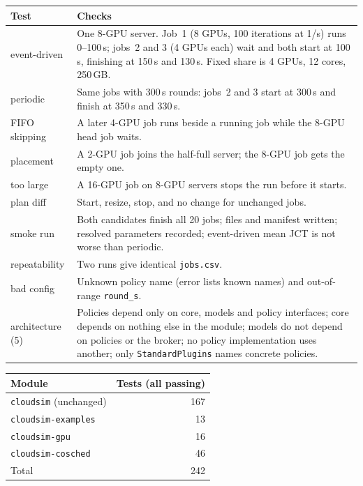\documentclass[11pt,a4paper]{article}
\newcommand{\code}[1]{\texttt{#1}}
\begin{document}
\begin{center}
\begin{tabularx}{\linewidth}{@{}lX@{}}
\toprule
Test & Checks \\
\midrule
event-driven & One 8-GPU server. Job~1 (8 GPUs, 100 iterations at 1/s) runs 0--100\,s; jobs~2 and 3
  (4 GPUs each) wait and both start at 100\,s, finishing at 150\,s and 130\,s. Fixed share is 4 GPUs,
  12 cores, 250\,GB. \\
periodic & Same jobs with 300\,s rounds: jobs~2 and 3 start at 300\,s and finish at 350\,s and 330\,s. \\
FIFO skipping & A later 4-GPU job runs beside a running job while the 8-GPU head job waits. \\
placement & A 2-GPU job joins the half-full server; the 8-GPU job gets the empty one. \\
too large & A 16-GPU job on 8-GPU servers stops the run before it starts. \\
plan diff & Start, resize, stop, and no change for unchanged jobs. \\
smoke run & Both candidates finish all 20 jobs; files and manifest written; resolved parameters
  recorded; event-driven mean JCT is not worse than periodic. \\
repeatability & Two runs give identical \code{jobs.csv}. \\
bad config & Unknown policy name (error lists known names) and out-of-range \code{round\_s}. \\
architecture (5) & Policies depend only on core, models and policy interfaces; core depends on nothing
  else in the module; models do not depend on policies or the broker; no policy implementation uses
  another; only \code{StandardPlugins} names concrete policies. \\
\bottomrule
\end{tabularx}
\end{center}

\begin{center}
\begin{tabular}{@{}lr@{}}
\toprule
Module & Tests (all passing) \\
\midrule
\code{cloudsim} (unchanged) & 167 \\
\code{cloudsim-examples} & 13 \\
\code{cloudsim-gpu} & 16 \\
\code{cloudsim-cosched} & 46 \\
\midrule
Total & 242 \\
\bottomrule
\end{tabular}
\end{center}
\end{document}
